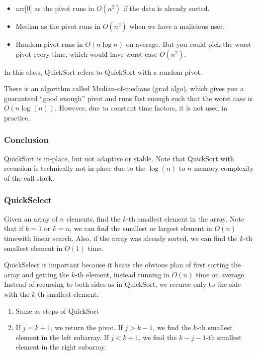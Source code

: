 \documentclass[a4paper]{article}
\begin{document}
\begin{itemize}
	\item arr[0] as the pivot runs in \( O(n^2) \) if the data is already sorted.
	\item Median as the pivot runs in \( O(n^2) \) when we have a malicious user.
	\item Random pivot runs in \( O(n \log n) \) on average. But you could pick the worst pivot every time, which would have worst case \( O(n^2) \).
\end{itemize}

\begin{remark}
	In this class, QuickSort refers to QuickSort with a random pivot.
\end{remark}

\begin{note}
	There is an algorithm called Median-of-medians (grad algo), which gives you a guaranteed ``good enough'' pivot and runs fast enough such that the worst case is \( O(n\log (n)) \). However, due to constant time factors, it is not used in practice.
\end{note}

\subsubsection{Conclusion}
QuickSort is in-place, but not adaptive or stable. Note that QuickSort with recursion is technically not in-place due to the \( \log (n) \) to \( n \) memory complexity of the call stack.

\subsubsection{QuickSelect}
Given an array of \( n \) elements, find the \( k \)-th smallest element in the array. Note that if \( k=1 \) or \( k=n \), we can find the smallest or largest element in \( O(n) \) timewith linear search. Also, if the array was already sorted, we can find the \( k \)-th smallest element in \( O(1) \) time.

QuickSelect is important because it beats the obvious plan of first sorting the array and getting the \( k \)-th element, instead running in \( O(n) \) time on average. Instead of recursing to both sides as in QuickSort, we recurse only to the side with the \( k \)-th smallest element. 

\begin{enumerate}
	\item Same as steps of QuickSort
	\item If \( j=k+1 \), we return the pivot. If \( j > k-1 \), we find the \( k \)-th smallest element in the left subarray. If \( j < k+1 \), we find the \( k-j-1 \)-th smallest element in the right subarray.
\end{enumerate}
\end{document}
